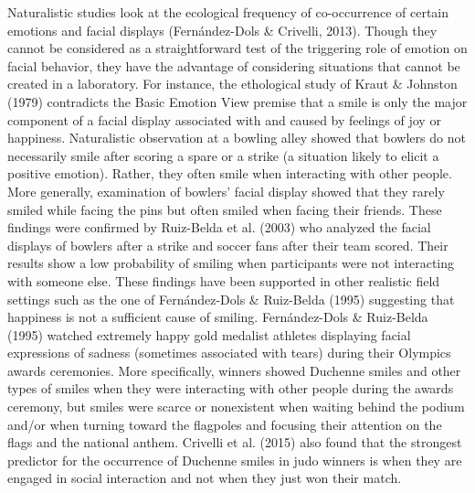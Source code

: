 \documentclass[
  english,
  doc]{apa7}
\begin{document}
Naturalistic studies look at the ecological frequency of co-occurrence of certain emotions and facial displays (Fernández-Dols \& Crivelli, 2013). Though they cannot be considered as a straightforward test of the triggering role of emotion on facial behavior, they have the advantage of considering situations that cannot be created in a laboratory. For instance, the ethological study of Kraut \& Johnston (1979) contradicts the Basic Emotion View premise that a smile is only the major component of a facial display associated with and caused by feelings of joy or happiness. Naturalistic observation at a bowling alley showed that bowlers do not necessarily smile after scoring a spare or a strike (a situation likely to elicit a positive emotion). Rather, they often smile when interacting with other people. More generally, examination of bowlers' facial display showed that they rarely smiled while facing the pins but often smiled when facing their friends. These findings were confirmed by Ruiz-Belda et al. (2003) who analyzed the facial displays of bowlers after a strike and soccer fans after their team scored. Their results show a low probability of smiling when participants were not interacting with someone else. These findings have been supported in other realistic field settings such as the one of Fernández-Dols \& Ruiz-Belda (1995) suggesting that happiness is not a sufficient cause of smiling. Fernández-Dols \& Ruiz-Belda (1995) watched extremely happy gold medalist athletes displaying facial expressions of sadness (sometimes associated with tears) during their Olympics awards ceremonies. More specifically, winners showed Duchenne smiles and other types of smiles when they were interacting with other people during the awards ceremony, but smiles were scarce or nonexistent when waiting behind the podium and/or when turning toward the flagpoles and focusing their attention on the flags and the national anthem. Crivelli et al. (2015) also found that the strongest predictor for the occurrence of Duchenne smiles in judo winners is when they are engaged in social interaction and not when they just won their match.
\end{document}
